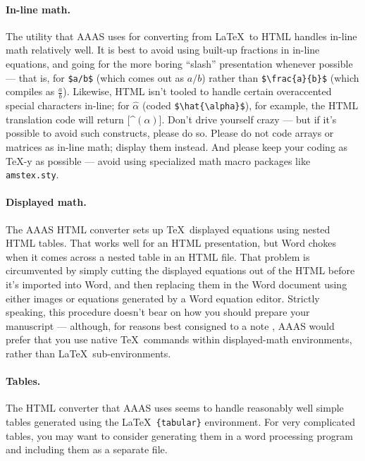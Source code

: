 \documentclass[12pt]{article}
\begin{document}
\paragraph*{In-line math.}  The utility that AAAS uses for converting
from \LaTeX\ to HTML handles in-line math relatively well.  It is best
to avoid using built-up fractions in in-line equations, and going for
the more boring ``slash'' presentation whenever possible --- that is,
for \verb+$a/b$+ (which comes out as $a/b$) rather than
\verb+$\frac{a}{b}$+ (which compiles as $\frac{a}{b}$).  Likewise,
HTML isn't tooled to handle certain overaccented special characters
in-line; for $\hat{\alpha}$ (coded \verb+$\hat{\alpha}$+), for
example, the HTML translation code will return [\^{}$(\alpha)$].
Don't drive yourself crazy --- but if it's possible to avoid such
constructs, please do so.  Please do not code arrays or matrices as
in-line math; display them instead.  And please keep your coding as
\TeX-y as possible --- avoid using specialized math macro packages
like \texttt{amstex.sty}.

\paragraph*{Displayed math.} The AAAS HTML converter sets up \TeX\
displayed equations using nested HTML tables.  That works well for an
HTML presentation, but Word chokes when it comes across a nested
table in an HTML file.  That problem is circumvented by simply cutting the
displayed equations out of the HTML before it's imported into Word,
and then replacing them in the Word document using either images or
equations generated by a Word equation editor.  Strictly speaking,
this procedure doesn't bear on how you should prepare your manuscript
--- although, for reasons best consigned to a note \cite{nattex}, AAAS would
prefer that you use native \TeX\ commands within displayed-math
environments, rather than \LaTeX\ sub-environments.

\paragraph*{Tables.}  The HTML converter that AAAS uses seems to handle
reasonably well simple tables generated using the \LaTeX\
\texttt{\{tabular\}} environment.  For very complicated tables, you
may want to consider generating them in a word processing program and
including them as a separate file.
\end{document}
